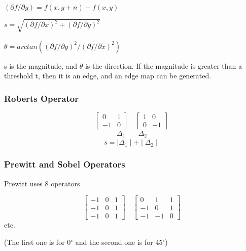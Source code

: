 \documentclass{article}
\begin{document}
\begin{multicols}{2}
$(\partial f/\partial y) = f(x, y+n) - f(x,y)$

$s = \sqrt{(\partial f/\partial x)^2 + (\partial f/\partial y)^2}$

$\theta = arctan((\partial f/\partial y)^2/(\partial f/\partial x)^2)$

s is the magnitude, and $\theta$ is the direction.
If the magnitude is greater than a threshold t, then it is an edge, and an edge map can be generated.

\subsubsection{Roberts Operator}

        \[
          \begin{bmatrix}
            0 & 1\\
            -1 & 0
          \end{bmatrix}\quad
          \begin{bmatrix}
            1 & 0\\
            0 & -1
          \end{bmatrix}
        \]
        \[
          \begin{matrix}
            \Delta_1
          \end{matrix}\quad
          \begin{matrix}
            \Delta_2
          \end{matrix}
        \]
\[s = \mid\Delta_1\mid + \mid\Delta_2\mid\]

\subsubsection{Prewitt and Sobel Operators}

Prewitt uses 8 operators

        \[
          \begin{bmatrix}
            -1 & 0 & 1\\
            -1 & 0 & 1\\
            -1 & 0 & 1
          \end{bmatrix}\quad
          \begin{bmatrix}
            0 & 1 & 1\\
            -1 & 0 & 1\\
            -1 & -1 & 0
          \end{bmatrix}
        \]
etc.

(The first one is for 0$^{\circ}$ and the second one is for 45$^{\circ}$)


\end{multicols}
\end{document}
